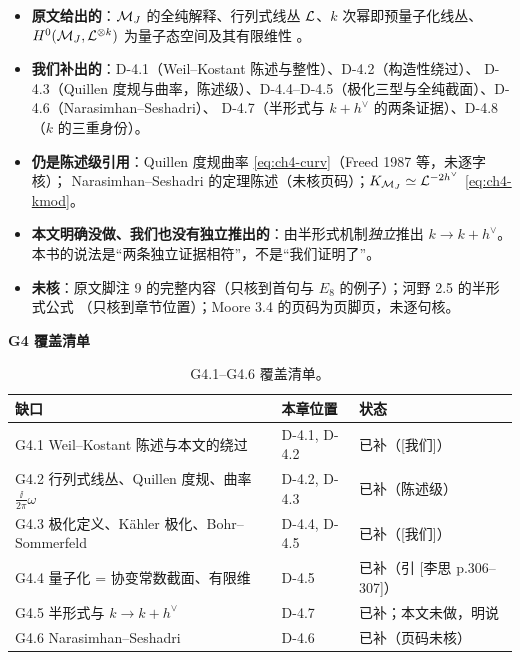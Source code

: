 \begin{boundary}
\begin{itemize}[leftmargin=1.4em]
\item \textbf{原文给出的}：$\mathcal{M}_J$ 的全纯解释、行列式线丛 $\mathcal{L}$、$k$ 次幂即预量子化线丛、
$H^0(\mathcal{M}_J,\mathcal{L}^{\otimes k})$ 为量子态空间及其有限维性 。
\item \textbf{我们补出的}：D-4.1（Weil--Kostant 陈述与整性）、D-4.2（构造性绕过）、
D-4.3（Quillen 度规与曲率，陈述级）、D-4.4--D-4.5（极化三型与全纯截面）、D-4.6（Narasimhan--Seshadri）、
D-4.7（半形式与 $k+h^\vee$ 的两条证据）、D-4.8（$k$ 的三重身份）。
\item \textbf{仍是陈述级引用}：Quillen 度规曲率 \eqref{eq:ch4-curv}（Freed 1987 等，未逐字核）；
Narasimhan--Seshadri 的定理陈述（未核页码）；$K_{\mathcal{M}_J}\simeq\mathcal{L}^{-2h^\vee}$ \eqref{eq:ch4-kmod}。
\item \textbf{本文明确没做、我们也没有独立推出的}：由半形式机制\emph{独立}推出 $k\to k+h^\vee$。
本书的说法是“两条独立证据相符”，不是“我们证明了”。
\item \textbf{未核}：原文脚注 9 的完整内容（只核到首句与 $E_8$ 的例子）；河野 2.5 的半形式公式
（只核到章节位置）；Moore 3.4 的页码为页脚页，未逐句核。
\end{itemize}
\end{boundary}

\noindent\textbf{G4 覆盖清单}
\begin{table}[htbp]
\centering
\small
\setlength{\tabcolsep}{4pt}
\begin{tabular}{@{}lll@{}}
\toprule
缺口 & 本章位置 & 状态 \\
\midrule
G4.1 Weil--Kostant 陈述与本文的绕过 & D-4.1, D-4.2 & 已补（[我们]）\\
G4.2 行列式线丛、Quillen 度规、曲率 $\frac{\ii}{2\pi}\omega$ & D-4.2, D-4.3 & 已补（陈述级）\\
G4.3 极化定义、Kähler 极化、Bohr--Sommerfeld & D-4.4, D-4.5 & 已补（[我们]）\\
G4.4 量子化 = 协变常数截面、有限维 & D-4.5 & 已补（引 [李思 p.306--307]）\\
G4.5 半形式与 $k\to k+h^\vee$ & D-4.7 & 已补；本文未做，明说\\
G4.6 Narasimhan--Seshadri & D-4.6 & 已补（页码未核）\\
\bottomrule
\end{tabular}
\caption{G4.1--G4.6 覆盖清单。}
\end{table}

